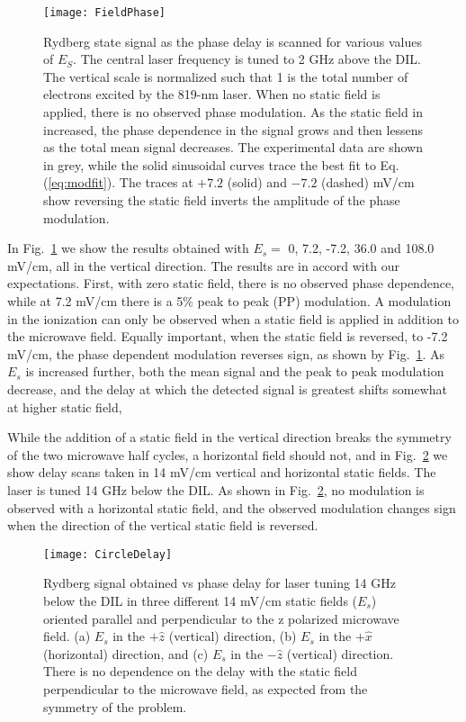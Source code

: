 \documentclass[aps,pra,reprint,groupedaddress]{revtex4-1}
\begin{document}
\begin{figure}
	\texttt{[image: FieldPhase]}
	\caption{Rydberg state signal as the phase delay is scanned for various values of $E_S$. The central laser frequency is tuned to 2 GHz above the DIL. The vertical scale is normalized such that 1 is the total number of electrons excited by the 819-nm laser. When no static field is applied, there is no observed phase modulation. As the static field in increased, the phase dependence in the signal grows and then lessens as the total mean signal decreases. The experimental data are shown in grey, while the solid sinusoidal curves trace the best fit to Eq. (\ref{eq:modfit}). The traces at $+7.2$ (solid) and $-7.2$ (dashed) mV/cm show reversing the static field inverts the amplitude of the phase modulation.}
	\label{fig:fph}
\end{figure}

In Fig.~\ref{fig:fph} we show the results obtained with $E_{s}=$ 0, 7.2, -7.2, 36.0 and 108.0 mV/cm, all in the vertical direction. The results are in accord with our expectations. First, with zero static field, there is no observed phase dependence, while at 7.2 mV/cm there is a 5\% peak to peak (PP) modulation. A modulation in the ionization can only be observed when a static field is applied in addition to the microwave field. Equally important, when the static field is reversed, to -7.2 mV/cm, the phase dependent modulation reverses sign, as shown by Fig.~\ref{fig:fph}. As $E_s$ is increased further, both the mean signal and the peak to peak modulation decrease, and the delay at which the detected signal is greatest shifts somewhat at higher static field,

While the addition of a static field in the vertical direction breaks the symmetry of the two microwave half cycles, a horizontal field should not, and in Fig.~\ref{fig:CircleDelay} we show delay scans taken in 14 mV/cm vertical and horizontal static fields. The laser is tuned 14 GHz below the DIL. As shown in Fig.~\ref{fig:CircleDelay}, no modulation is observed with a horizontal static field, and the observed modulation changes sign when the direction of the vertical static field is reversed.

\begin{figure}
	\texttt{[image: CircleDelay]}
	\caption{Rydberg signal obtained vs phase delay for laser tuning 14 GHz below the DIL in three different 14 mV/cm static fields ($E_s$) oriented parallel and perpendicular to the z polarized microwave field. (a) $E_s$ in the $+\hat{z}$ (vertical) direction, (b) $E_s$ in the $+\hat{x}$ (horizontal) direction, and (c) $E_s$ in the $-\hat{z}$ (vertical) direction. There is no dependence on the delay with the static field perpendicular to the microwave field, as expected from the symmetry of the problem.}
	\label{fig:CircleDelay}
\end{figure}
\end{document}
